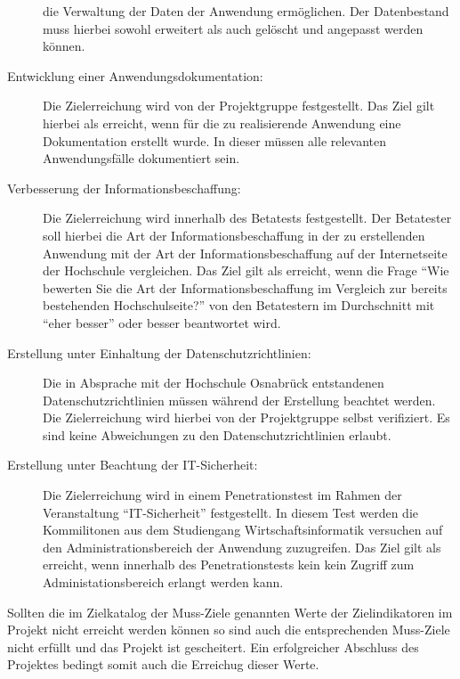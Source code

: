 \begin{description}
	die Verwaltung der Daten der Anwendung ermöglichen. Der Datenbestand muss
	hierbei sowohl erweitert als auch gelöscht und angepasst werden können.
	\item[Entwicklung einer Anwendungsdokumentation:] Die Zielerreichung wird
	von der Projektgruppe festgestellt. Das Ziel gilt hierbei als erreicht, wenn
	für die zu realisierende Anwendung eine Dokumentation erstellt wurde. In dieser
	müssen alle relevanten Anwendungsfälle dokumentiert sein.
	\item[Verbesserung der Informationsbeschaffung:] Die Zielerreichung wird
	innerhalb des Betatests festgestellt. Der Betatester soll hierbei die Art
	der Informationsbeschaffung in der zu erstellenden Anwendung mit der Art
	der Informationsbeschaffung auf der Internetseite der Hochschule
	vergleichen. Das Ziel gilt als erreicht, wenn die Frage "`Wie bewerten Sie die
	Art der Informationsbeschaffung im Vergleich zur bereits bestehenden
	Hochschulseite?"' von den Betatestern im Durchschnitt mit "`eher besser"' oder
	besser beantwortet wird.
	\item[Erstellung unter Einhaltung der Datenschutzrichtlinien:] 
	Die in Absprache
	mit der Hochschule Osnabrück entstandenen Datenschutzrichtlinien müssen während
	der Erstellung beachtet werden. Die Zielerreichung wird hierbei von der
	Projektgruppe selbst verifiziert. Es sind keine Abweichungen zu den
	Datenschutzrichtlinien erlaubt.
	\item[Erstellung unter Beachtung der IT-Sicherheit:] Die Zielerreichung wird
	in einem Penetrationstest im Rahmen der Veranstaltung "`IT-Sicherheit"'
	festgestellt. In diesem Test werden die Kommilitonen aus dem Studiengang
	Wirtschaftsinformatik versuchen auf den Administrationsbereich der Anwendung
	zuzugreifen. Das Ziel gilt als erreicht, wenn innerhalb des
	Penetrationstests kein kein Zugriff zum Administationsbereich erlangt werden
	kann.
\end{description}


Sollten die im Zielkatalog der Muss-Ziele genannten Werte der Zielindikatoren
im Projekt nicht erreicht werden können so sind auch die entsprechenden
Muss-Ziele nicht erfüllt und das Projekt ist gescheitert. Ein erfolgreicher
Abschluss des Projektes bedingt somit auch die Erreichug dieser Werte.

